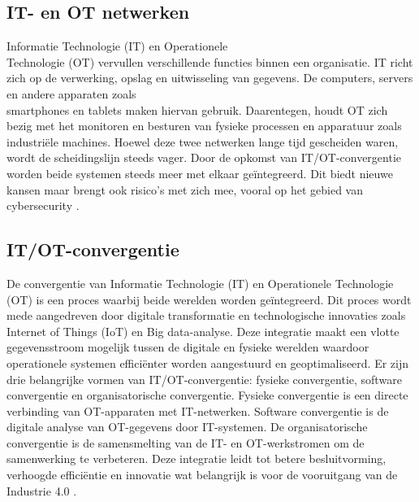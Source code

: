 \subsection{IT- en OT netwerken}
Informatie Technologie (IT) en Operationele \\Technologie (OT) vervullen verschillende functies binnen een organisatie. IT richt zich op de verwerking, opslag en 
uitwisseling van gegevens. De computers, servers en andere apparaten zoals \\smartphones en tablets maken hiervan gebruik. Daarentegen, houdt OT zich bezig met het 
monitoren en besturen van fysieke processen en apparatuur zoals industriële machines. Hoewel deze twee netwerken lange tijd gescheiden waren, 
\\wordt de scheidingslijn steeds vager. Door de opkomst van IT/OT-convergentie worden beide systemen steeds meer met elkaar geïntegreerd. Dit biedt nieuwe kansen
maar brengt ook risico’s met zich mee, vooral op het gebied van cybersecurity \autocite{onlogic2023}.

\subsection{IT/OT-convergentie}
De convergentie van Informatie Technologie (IT) en Operationele Technologie (OT) is een proces waarbij beide werelden worden geïntegreerd. 
Dit proces wordt mede aangedreven door digitale transformatie en technologische innovaties zoals Internet of Things (IoT) en Big data-analyse. 
Deze integratie maakt een vlotte gegevensstroom mogelijk tussen de digitale en fysieke werelden
waardoor operationele systemen efficiënter worden aangestuurd en geoptimaliseerd. Er zijn drie belangrijke vormen van IT/OT-convergentie: fysieke convergentie, 
software convergentie en organisatorische convergentie. Fysieke convergentie is een directe verbinding van OT-apparaten met IT-netwerken. Software convergentie is 
de digitale analyse van OT-gegevens door IT-systemen. De organisatorische convergentie is de samensmelting van de IT- en OT-werkstromen om de samenwerking te verbeteren.
Deze integratie leidt tot betere besluitvorming, verhoogde efficiëntie en innovatie wat belangrijk is voor de vooruitgang van de Industrie 4.0 \autocite{maleh2021ot,paloaltonetworks2023}.


